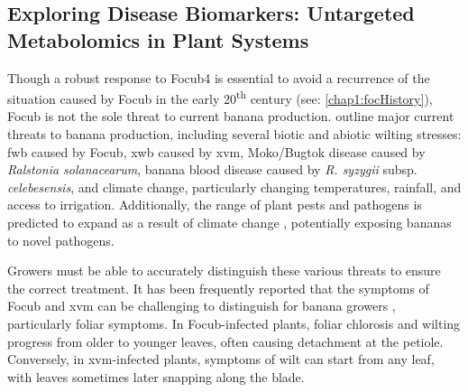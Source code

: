
\subsection{Exploring Disease Biomarkers: Untargeted Metabolomics in Plant Systems}
\label{section:BiomakerIntro}

Though a robust response to \ac{Focub4} is essential to avoid a recurrence of the situation caused by \ac{Focub} in the early 20\textsuperscript{th} century (see: \ref{chap1:focHistory}), \ac{Focub} is not the sole threat to current banana production. \textcite{Ploetz2015c, Bebber2023} outline major current threats to banana production, including several biotic and abiotic wilting stresses: \acf{fwb} caused by \ac{Focub}, \acf{xwb} caused by \acf{xvm}, Moko/Bugtok disease caused by \textit{Ralstonia solanacearum}, banana blood disease caused by \textit{R. syzygii} subsp. \textit{celebesensis}, and climate change, particularly changing temperatures, rainfall, and access to irrigation. Additionally, the range of plant pests and pathogens is predicted to expand as a result of climate change \parencite{Bebber2015}, potentially exposing bananas to novel pathogens.

Growers must be able to accurately distinguish these various threats to ensure the correct treatment. It has been frequently reported that the symptoms of \ac{Focub} and \ac{xvm} can be challenging to distinguish for banana growers \parencite{Stellenbosch24, PromusaSymps, Biruma2007}, particularly foliar symptoms. In \ac{Focub}-infected plants, foliar chlorosis and wilting progress from older to younger leaves, often causing detachment at the petiole. Conversely, in \ac{xvm}-infected plants, symptoms of wilt can start from any leaf, with leaves sometimes later snapping along the blade. 

